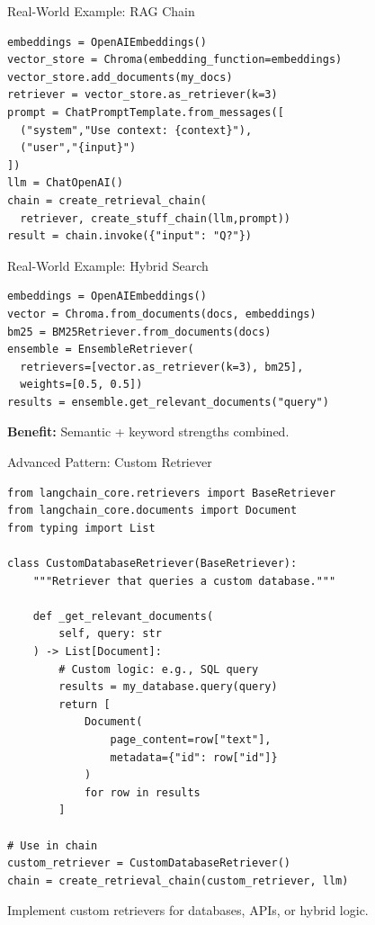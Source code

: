 \documentclass[aspectratio=169,11pt]{beamer}
\begin{document}
\begin{frame}[fragile]{Real-World Example: RAG Chain}
  \scriptsize
  \begin{lstlisting}[basicstyle=\ttfamily\tiny]
embeddings = OpenAIEmbeddings()
vector_store = Chroma(embedding_function=embeddings)
vector_store.add_documents(my_docs)
retriever = vector_store.as_retriever(k=3)
prompt = ChatPromptTemplate.from_messages([
  ("system","Use context: {context}"),
  ("user","{input}")
])
llm = ChatOpenAI()
chain = create_retrieval_chain(
  retriever, create_stuff_chain(llm,prompt))
result = chain.invoke({"input": "Q?"})
  \end{lstlisting}
\end{frame}

\begin{frame}[fragile]{Real-World Example: Hybrid Search}
  \begin{lstlisting}[basicstyle=\ttfamily\tiny]
embeddings = OpenAIEmbeddings()
vector = Chroma.from_documents(docs, embeddings)
bm25 = BM25Retriever.from_documents(docs)
ensemble = EnsembleRetriever(
  retrievers=[vector.as_retriever(k=3), bm25],
  weights=[0.5, 0.5])
results = ensemble.get_relevant_documents("query")
  \end{lstlisting}

  \textbf{Benefit:} Semantic + keyword strengths combined.
\end{frame}

\begin{frame}[fragile]{Advanced Pattern: Custom Retriever}
  \begin{lstlisting}[basicstyle=\ttfamily\tiny]
from langchain_core.retrievers import BaseRetriever
from langchain_core.documents import Document
from typing import List

class CustomDatabaseRetriever(BaseRetriever):
    """Retriever that queries a custom database."""

    def _get_relevant_documents(
        self, query: str
    ) -> List[Document]:
        # Custom logic: e.g., SQL query
        results = my_database.query(query)
        return [
            Document(
                page_content=row["text"],
                metadata={"id": row["id"]}
            )
            for row in results
        ]

# Use in chain
custom_retriever = CustomDatabaseRetriever()
chain = create_retrieval_chain(custom_retriever, llm)
  \end{lstlisting}

  \begin{tipbox}[Flexibility]
    Implement custom retrievers for databases, APIs, or hybrid logic.
  \end{tipbox}
\end{frame}
\end{document}
